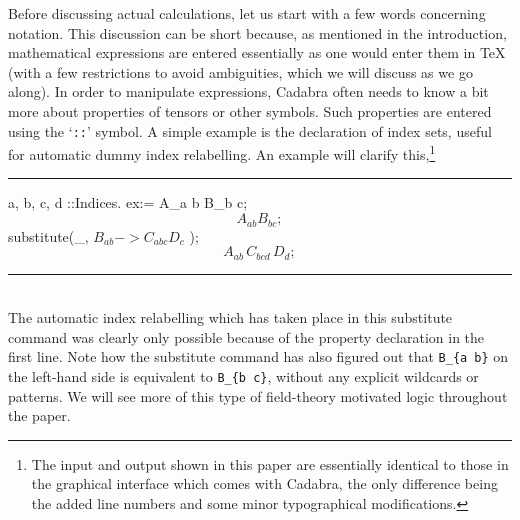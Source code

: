 \documentclass[11pt]{article}
\newcommand{\toprule}{\par\vspace{1ex}\noindent\hspace{25pt}\rule{435pt}{.1pt}}
\newcommand{\botrule}{\noindent\hspace{25pt}\rule{435pt}{.1pt}\\[2ex]}
\newenvironment{cdbin}{\fvset{firstnumber=1}\color[named]{Blue}\Verbatim}{\endVerbatim}
\newenvironment{cdbcont}{\fvset{firstnumber=last}\color[named]{Blue}\Verbatim}{\endVerbatim}
\newenvironment{cdbout}{\vspace{-1ex}\begin{equation}}{\end{equation}\vspace{-1ex}}
\newcommand{\Cdb}{{Cadabra}\xspace}
\begin{document}
Before discussing actual calculations, let us start with a few words
concerning notation. This discussion can be short because, as
mentioned in the introduction, mathematical expressions are entered
essentially as one would enter them in \TeX{} (with a few restrictions
to avoid ambiguities, which we will discuss as we go along). In order
to manipulate expressions, \Cdb often needs to know a bit more about
properties of tensors or other symbols. Such properties are entered
using the `\verb|::|' symbol. A simple example is the declaration of
index sets, useful for automatic dummy index relabelling. An example
will clarify this,\footnote{The input and output shown in this paper
are essentially identical to those in the graphical interface which
comes with \Cdb, the only difference being the added line numbers and
some minor typographical modifications.}  \toprule
\begin{cdbin}
{ a, b, c, d }::Indices.
ex:= A_{a b} B_{b c};
\end{cdbin}
\begin{cdbout}
A_{a b} B_{b c};
\end{cdbout}
\begin{cdbcont}
substitute(_, $B_{a b} ->  C_{a b c} D_{c}$ );
\end{cdbcont}
\begin{cdbout}
A_{a b} \, C_{b c d} \, D_{d};
\end{cdbout}
\botrule
The automatic index relabelling which has taken place in this
substitute command was clearly only possible because of the property
declaration in the first line. Note how the substitute command has
also figured out that \verb|B_{a b}| on the left-hand side is
equivalent to \verb|B_{b c}|, without any explicit wildcards or
patterns. We will see more of this type of field-theory motivated
logic throughout the paper.
\end{document}
